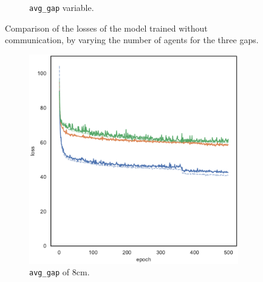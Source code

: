 \begin{figure}[!htb]
\begin{center}
\begin{subfigure}[h]{0.32\textwidth}
			\caption{\texttt{avg\_gap} variable.}
		\end{subfigure}
	\end{center}
	\vspace{-0.5cm}
	\caption[Losses summary of the second set of experiments (no 
	communication).]{Comparison of the losses of the model trained without 
		communication, by varying the number of agents for the three gaps.}
	\label{fig:distlossgapsexte}
\end{figure}
\begin{figure}[!htb]
	\begin{center}
		\begin{subfigure}[h]{0.32\textwidth}
			\includegraphics[width=\textwidth]{contents/images/task1-comm-extension/loss-communication-gap_8@copy}%
			\caption{\texttt{avg\_gap} of $8$\gls{cm}.}
		\end{subfigure}
		\hfill
		\begin{subfigure}[h]{0.32\textwidth}

\end{subfigure}
\end{center}
\end{figure}
